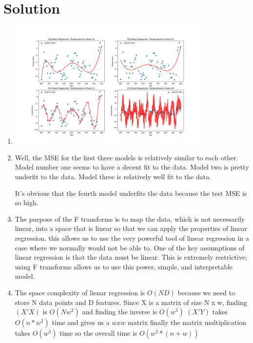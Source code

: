 \documentclass[submit]{../harvardml}
\newenvironment{solution}
  {\color{blue}\section*{Solution}}
{}
\begin{document}
\newpage 
\begin{solution}






  \begin{tcolorbox}[title=Solution,colback=white,colframe=black,breakable]

  \begin{enumerate}
    \item
      \includegraphics[width=0.8\textwidth]{img_output/p3.1.png}
  
    \item 
    Well, the MSE for the first three models is relatively similar to each other. Model number one seems to have a decent fit to the data. Model two is pretty underfit to the data. Model three is relatively well fit to the data. 
    

    It's obvious that the fourth model underfits the data because the test MSE is so high.
    
  
    \item 
  
    The purpose of the F transforms is to map the data, which is not necessarily linear, into a space that is linear so that we can apply the properties of linear regression.
    this allows us to use the very powerful tool of linear regression in a case where we normally would not be able to. One of the key assumptions of linear regression is that the data must be linear. This is extremely restrictive; using F transforms allows us to use this power, simple, and interpretable model. 

  
    \item 
    
    The space complexity of lienar regression is $O(ND)$ because we need to store N data points and D features. \newline 
    Since X is a matrix of size N x w, finding $(X' X)$ is $O(Nw^2)$ and finding the inverse is $O(w^3)$ \newline
    $(X' Y)$ takes$ O(n*w^2)$ time and gives us a $ w x w $ matrix \newline
    finally the matrix multiplication takes $O(w^3)$ time \newline
    so the overall time is $O(w^2*(n + w))$ 
    \newline


\end{enumerate}
\end{tcolorbox}
\end{solution}
\end{document}
